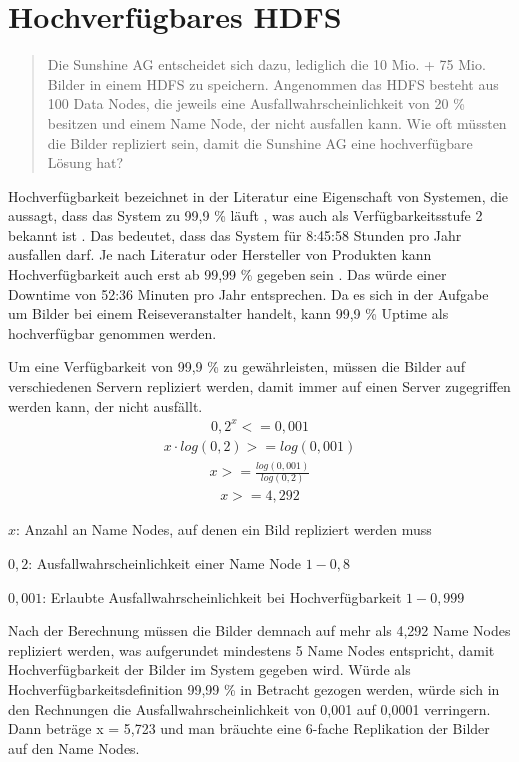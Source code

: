 \section{Hochverfügbares HDFS}
\begin{quote}
    Die Sunshine AG entscheidet sich dazu, lediglich die 10 Mio. + 75 Mio. Bilder in einem HDFS zu speichern. Angenommen das HDFS besteht aus 100 Data Nodes, die jeweils eine Ausfallwahrscheinlichkeit von 20 \% besitzen und einem Name Node, der nicht ausfallen kann. Wie oft müssten die Bilder repliziert sein, damit die Sunshine AG eine hochverfügbare Lösung hat? 
\end{quote}
Hochverfügbarkeit bezeichnet in der Literatur eine Eigenschaft von Systemen, die aussagt, dass das System zu 99,9 \% läuft \cite{bundesamt_fur_sicherheit_in_der_informationstechnik_einfuhrung_2013} \cite{portnoy_virtualisierung_2012} \cite{ieee_high_2010}, was auch als Verfügbarkeitsstufe 2 bekannt ist \cite{frey_hochverfugbarkeit_2010}. Das bedeutet, dass das System für 8:45:58 Stunden pro Jahr ausfallen darf. Je nach Literatur oder Hersteller von Produkten kann Hochverfügbarkeit auch erst ab 99,99 \% gegeben sein \cite{frey_hochverfugbarkeit_2010}. Das würde einer Downtime von 52:36 Minuten pro Jahr entsprechen. Da es sich in der Aufgabe um Bilder bei einem Reiseveranstalter handelt, kann 99,9 \% Uptime als hochverfügbar genommen werden. 

Um eine Verfügbarkeit von 99,9 \% zu gewährleisten, müssen die Bilder auf verschiedenen Servern repliziert werden, damit immer auf einen Server zugegriffen werden kann, der nicht ausfällt. 
\begin{align*}
    0,2^x <= 0,001
\end{align*}
\begin{align*}
    x \cdot log(0,2) >= log(0,001)
\end{align*}
\begin{align*}
    x >= \frac{log(0,001)}{log(0,2)}
\end{align*}
\begin{align*}
    x >= 4,292
\end{align*}

$x$: Anzahl an Name Nodes, auf denen ein Bild repliziert werden muss

$0,2$: Ausfallwahrscheinlichkeit einer Name Node $1 - 0,8$

$0,001$: Erlaubte Ausfallwahrscheinlichkeit bei Hochverfügbarkeit $1 - 0,999$

Nach der Berechnung müssen die Bilder demnach auf mehr als 4,292 Name Nodes repliziert werden, was aufgerundet mindestens 5 Name Nodes entspricht, damit Hochverfügbarkeit der Bilder im System gegeben wird. Würde als Hochverfügbarkeitsdefinition 99,99 \% in Betracht gezogen werden, würde sich in den Rechnungen die Ausfallwahrscheinlichkeit von 0,001 auf 0,0001 verringern. Dann beträge x = 5,723 und man bräuchte eine 6-fache Replikation der Bilder auf den Name Nodes.
